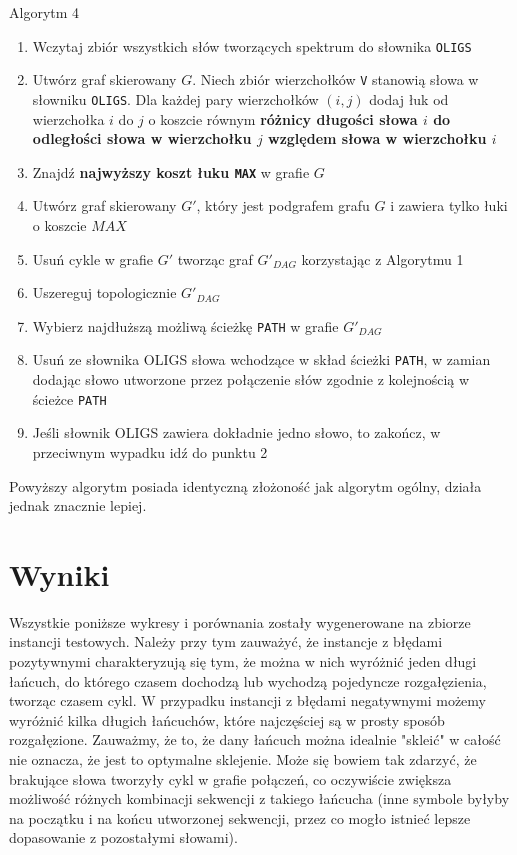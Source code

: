 \documentclass[a4paper,10pt]{article}
\begin{document}
Algorytm 4
\begin{enumerate}
 \item Wczytaj zbiór wszystkich słów tworzących spektrum do słownika \texttt{OLIGS}
 \item Utwórz graf skierowany $G$. Niech zbiór wierzchołków \texttt{V} stanowią słowa w słowniku \texttt{OLIGS}. 
       Dla każdej pary wierzchołków $(i,j)$ dodaj łuk od wierzchołka $i$ do $j$ o koszcie równym 
       {\bf różnicy długości słowa $i$ do odległości słowa w wierzchołku $j$ względem słowa w wierzchołku $i$}
 \item Znajdź {\bf najwyższy koszt łuku \texttt{MAX}} w grafie $G$
 \item Utwórz graf skierowany $G'$, który jest podgrafem grafu $G$ i zawiera tylko łuki o koszcie $MAX$
 \item Usuń cykle w grafie $G'$ tworząc graf $G'_{DAG}$ korzystając z Algorytmu 1
 \item Uszereguj topologicznie $G'_{DAG}$
 \item Wybierz najdłuższą możliwą ścieżkę \texttt{PATH} w grafie $G'_{DAG}$
 \item Usuń ze słownika OLIGS słowa wchodzące w skład ścieżki \texttt{PATH}, w zamian dodając słowo utworzone przez połączenie słów zgodnie z kolejnością w ścieżce \texttt{PATH}
 \item Jeśli słownik OLIGS zawiera dokładnie jedno słowo, to zakończ, w przeciwnym wypadku idź do punktu 2
\end{enumerate}

Powyższy algorytm posiada identyczną złożoność jak algorytm ogólny, działa jednak znacznie lepiej.

\section{Wyniki}

Wszystkie poniższe wykresy i porównania zostały wygenerowane na zbiorze instancji testowych. Należy przy tym zauważyć, 
że instancje z błędami pozytywnymi charakteryzują się tym, że można w nich wyróżnić jeden długi łańcuch, do którego 
czasem dochodzą lub wychodzą pojedyncze rozgałęzienia, tworząc czasem cykl. W przypadku instancji z błędami negatywnymi 
możemy wyróżnić kilka długich łańcuchów, które najczęściej są w prosty sposób rozgałęzione. Zauważmy, że to, że dany 
łańcuch można idealnie "skleić" w całość nie oznacza, że jest to optymalne sklejenie. Może się bowiem tak zdarzyć, 
że brakujące słowa tworzyły cykl w grafie połączeń, co oczywiście zwiększa możliwość różnych kombinacji sekwencji z 
takiego łańcucha (inne symbole byłyby na początku i na końcu utworzonej sekwencji, przez co mogło istnieć lepsze dopasowanie z pozostałymi słowami).
\end{document}
